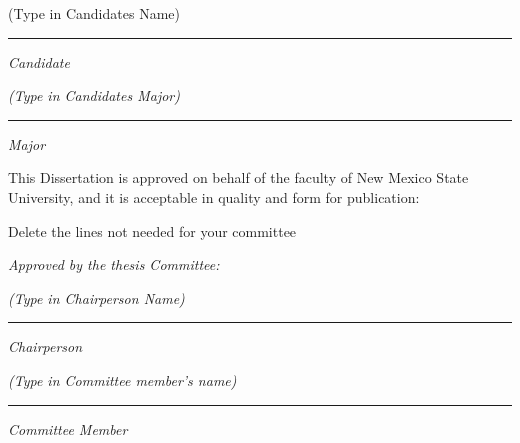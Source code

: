 \noindent

\setlength{\baselineskip}{\singlespace}
\vspace{0.1in}
\begin{flushleft}

\small
(Type in Candidates Name)

\vspace{4pt}
\hrule
\vspace{4pt}

\large
\textit{Candidate}

\vspace{0.3in}

\small
\textit{(Type in Candidates Major)}

\vspace{4pt}
\hrule
\vspace{4pt}

\large
\textit{Major}

\vspace{0.4in}

\small
This Dissertation is approved on behalf of the faculty of New Mexico State University, and it is acceptable in quality and form for publication:
\begin{center} 
Delete the lines not needed for your committee
\end{center}


\large
\textit{Approved by the thesis Committee:}

\vspace{0.2in}

\small
\textit{(Type in Chairperson Name)}
\vspace{4pt}
\hrule
\vspace{4pt}
\large
\textit{Chairperson}

\vspace{0.2in}

\small
\textit{(Type in Committee member's name)}
\vspace{4pt}
\hrule
\vspace{4pt}
\large
\textit{Committee Member}

\vspace{0.2in}


\end{flushleft}
